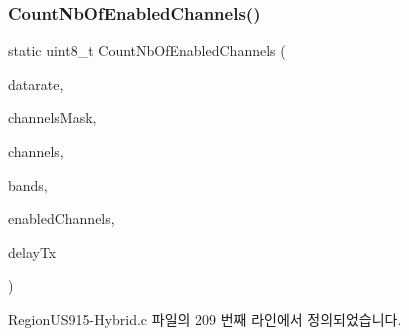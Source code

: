 \subsubsection{\texorpdfstring{Count\+Nb\+Of\+Enabled\+Channels()}{CountNbOfEnabledChannels()}}
{\footnotesize\ttfamily static uint8\+\_\+t Count\+Nb\+Of\+Enabled\+Channels (\begin{DoxyParamCaption}\item[{uint8\+\_\+t}]{datarate,  }\item[{uint16\+\_\+t $\ast$}]{channels\+Mask,  }\item[{\mbox{\hyperlink{group___l_o_r_a_m_a_c_ga1360ca6f82c6d125ea43a9dad9b56184}{Channel\+Params\+\_\+t}} $\ast$}]{channels,  }\item[{\mbox{\hyperlink{group___l_o_r_a_m_a_c_ga8f49721ee96ceb52c80a896ab11a2ed8}{Band\+\_\+t}} $\ast$}]{bands,  }\item[{uint8\+\_\+t $\ast$}]{enabled\+Channels,  }\item[{uint8\+\_\+t $\ast$}]{delay\+Tx }\end{DoxyParamCaption})\hspace{0.3cm}{\ttfamily [static]}}



Region\+U\+S915-\/\+Hybrid.\+c 파일의 209 번째 라인에서 정의되었습니다.


